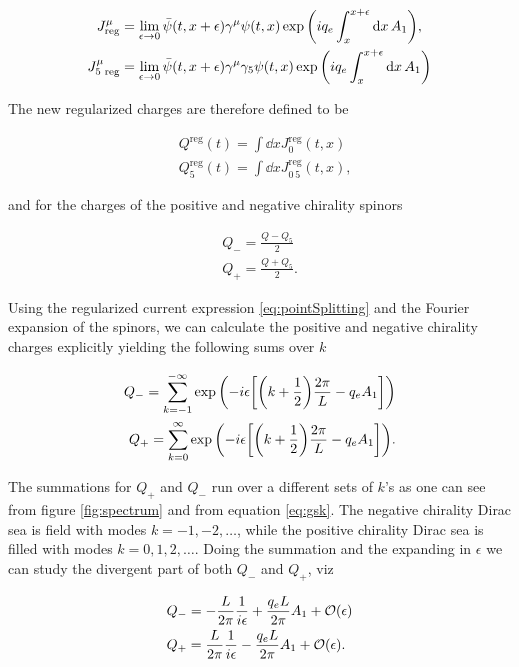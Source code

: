 \begin{align}
    J^\mu_{\text{reg}} &= \lim_{\epsilon\to 0} \bar{\psi}(t,x+\epsilon)\gamma^\mu \psi(t,x)\exp\qty(i q_e \int_x^{x+\epsilon}\dd{x}A_1),\nonumber\\
    J^\mu_{5\text{ reg}} &= \lim_{\epsilon\to 0} \bar{\psi}(t,x+\epsilon)\gamma^\mu\gamma_5 \psi(t,x)\exp\qty(i q_e \int_x^{x+\epsilon}\dd{x}A_1)\label{eq:pointSplitting}
\end{align}

The new regularized charges are therefore defined to be

\begin{align}
    &Q^{\text{reg}} (t)= \int \dd{x}J^{\text{reg}}_0 (t,x)\nonumber\\
    &Q_5^{\text{reg}} (t) = \int \dd{x}J^{\text{reg}}_{0\,5} (t,x),
\end{align}

and for the charges of the positive and negative chirality spinors

\begin{align}
    Q_- = \frac{Q - Q_5}{2}\nonumber\\
    Q_+ = \frac{Q + Q_5}{2}.
\end{align}

Using the regularized current expression \eqref{eq:pointSplitting} and the Fourier expansion of the spinors, we can calculate the positive and negative chirality charges explicitly yielding the following sums over $k$

\begin{align}
    Q_- = \sum_{k=-1}^{-\infty} \exp\qty(-i \epsilon\qty[\qty(k + \frac{1}{2})\frac{2\pi}{L} - q_e A_1])\nonumber\\
    Q_+ = \sum_{k=0}^{\infty} \exp\qty(-i \epsilon\qty[\qty(k + \frac{1}{2})\frac{2\pi}{L} - q_e A_1]).
\end{align}

The summations for $Q_+$ and $Q_-$  run over a different sets of $k$'s as one can see from figure \ref{fig:spectrum} and from equation \eqref{eq:gsk}. The negative chirality Dirac sea is field with modes $k=-1,-2,\ldots$, while the positive chirality Dirac sea is filled with modes $k=0,1,2,\ldots$. Doing the summation and the expanding in $\epsilon$ we can study the divergent part of both $Q_-$ and $Q_+$, viz

\begin{align}
    &Q_-=-\frac{ L}{2\pi}\frac{1}{i\epsilon} + \frac{q_e L}{2\pi}A_1 + \order{\epsilon}\nonumber\\
    &Q_+ = \frac{ L}{2\pi}\frac{1}{i\epsilon} - \frac{q_e L}{2\pi}A_1 + \order{\epsilon}.\label{eq:chargesUV}  
\end{align}
 
